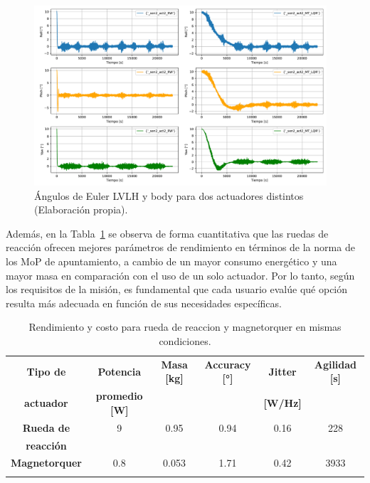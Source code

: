 \begin{figure}[H]
	\centering    
	\includegraphics[width=0.97\textwidth]{MT_RW_nivel2.pdf}
	\caption{Ángulos de Euler LVLH y body para dos actuadores distintos (Elaboración propia).}
	\label{fig:MT_RW_nivel2}
\end{figure}

Además, en la Tabla~\ref{tab:RW_MT_nivel2} se observa de forma cuantitativa que las ruedas de reacción ofrecen mejores parámetros de rendimiento en términos de la norma de los MoP de apuntamiento, a cambio de un mayor consumo energético y una mayor masa en comparación con el uso de un solo actuador. Por lo tanto, según los requisitos de la misión, es fundamental que cada usuario evalúe qué opción resulta más adecuada en función de sus necesidades específicas.

\begin{table}[h!]
	\centering
	\caption{Rendimiento y costo para rueda de reaccion y magnetorquer en mismas condiciones.}
	\begin{tabular}{|c|c|c|c|c|c|}
		\hline
		\textbf{Tipo de}   & \textbf{Potencia} & \textbf{Masa [kg]} & \textbf{Accuracy [°]} & \textbf{Jitter} & \textbf{Agilidad [s]}  \\ 
		\textbf{actuador}   & \textbf{promedio [W]} & & & \textbf{[W/Hz]} &  \\
		\hline
		\textbf{Rueda de}   & 9  & 0.95  & 0.94 & 0.16 & 228   \\
		\textbf{reacción}   &  &   &  &  &    \\
		\hline
		\textbf{Magnetorquer}   & 0.8  & 0.053  & 1.71 & 0.42 & 3933   \\
		& & & & &   \\
		\hline
	\end{tabular}
	\label{tab:RW_MT_nivel2}
\end{table}


